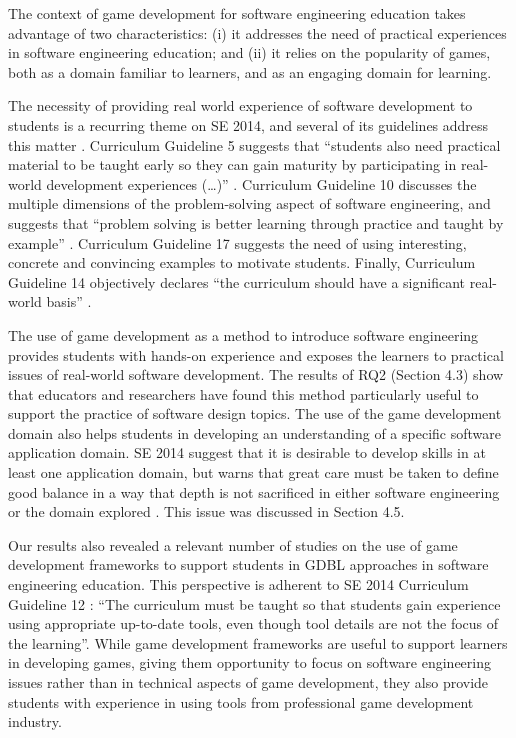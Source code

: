The context of game development for software engineering education takes advantage of two characteristics: (i) it addresses the need of practical experiences in software engineering education; and (ii) it relies on the popularity of games, both as a domain familiar to learners, and as an engaging domain for learning.

The necessity of providing real world experience of software development to students is a recurring theme on SE 2014, and several of its guidelines address this matter \citep{Acm:2015}. Curriculum Guideline 5 suggests that “students also need practical material to be taught early so they can gain maturity by participating in real-world development experiences (…)” \citep{Acm:2015}. Curriculum Guideline 10 discusses the multiple dimensions of the problem-solving aspect of software engineering, and suggests that “problem solving is better learning through practice and taught by example” \citep{Acm:2015}. Curriculum Guideline 17 suggests the need of using interesting, concrete and convincing examples to motivate students. Finally, Curriculum Guideline 14 objectively declares “the curriculum should have a significant real-world basis” \citep{Acm:2015}.

The use of game development as a method to introduce software engineering provides students with hands-on experience and exposes the learners to practical issues of real-world software development. The results of RQ2 (Section 4.3) show that educators and researchers have found this method particularly useful to support the practice of software design topics. The use of the game development domain also helps students in developing an understanding of a specific software application domain. SE 2014 suggest that it is desirable to develop skills in at least one application domain, but warns that great care must be taken to define good balance in a way that depth is not sacrificed in either software engineering or the domain explored \citep{Acm:2015}. This issue was discussed in Section 4.5.

Our results also revealed a relevant number of studies on the use of game development frameworks to support students in GDBL approaches in software engineering education. This perspective is adherent to SE 2014 Curriculum Guideline 12 \citep{Acm:2015}: “The curriculum must be taught so that students gain experience using appropriate up-to-date tools, even though tool details are not the focus of the learning”. While game development frameworks are useful to support learners in developing games, giving them opportunity to focus on software engineering issues rather than in technical aspects of game development, they also provide students with experience in using tools from professional game development industry.

